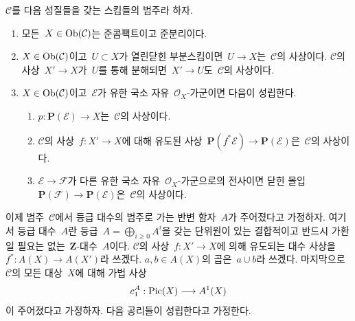 \medskip\noindent
$\mathcal{C}$를 다음 성질들을 갖는 스킴들의 범주라 하자.
\begin{enumerate}
\item 모든\  $X \in \mathop{\mathrm{Ob}}\nolimits(\mathcal{C})$는 준콤팩트이고 준분리이다.
\item $X \in \mathop{\mathrm{Ob}}\nolimits(\mathcal{C})$이고\  $U \subset X$가 열린닫힌
부분스킴이면\  $U \to X$는\  $\mathcal{C}$의 사상이다.
$\mathcal{C}$의 사상\  $X' \to X$가\  $U$를 통해 분해되면\ 
$X' \to U$도\  $\mathcal{C}$의 사상이다.
\item $X \in \mathop{\mathrm{Ob}}\nolimits(\mathcal{C})$이고\  $\mathcal{E}$가 유한 국소 자유\ 
$\mathcal{O}_X$-가군이면 다음이 성립한다.
\begin{enumerate}
\item $p : \mathbf{P}(\mathcal{E}) \to X$는\  $\mathcal{C}$의 사상이다.
\item $\mathcal{C}$의 사상\  $f : X' \to X$에 대해 유도된 사상\ 
$\mathbf{P}(f^*\mathcal{E}) \to \mathbf{P}(\mathcal{E})$은\ 
$\mathcal{C}$의 사상이다.
\item $\mathcal{E} \to \mathcal{F}$가 다른 유한 국소 자유\ 
$\mathcal{O}_X$-가군으로의 전사이면 닫힌 몰입\ 
$\mathbf{P}(\mathcal{F}) \to \mathbf{P}(\mathcal{E})$은\ 
$\mathcal{C}$의 사상이다.
\end{enumerate}
\end{enumerate}
이제 범주\  $\mathcal{C}$에서 등급 대수의 범주로 가는 반변 함자\ 
$A$가 주어졌다고 가정하자. 여기서 등급 대수\  $A$란 등급\ 
$A = \bigoplus_{i \geq 0} A^i$을 갖는 단위원이 있는 결합적이고
반드시 가환일 필요는 없는\  $\mathbf{Z}$-대수\  $A$이다.
$\mathcal{C}$의 사상\  $f : X' \to X$에 의해 유도되는 대수 사상을\ 
$f^* : A(X) \to A(X')$라 쓰겠다. $a, b \in A(X)$의 곱은\ 
$a \cup b$라 쓰겠다. 마지막으로\  $\mathcal{C}$의 모든 대상\  $X$에
대해 가법 사상
$$
c_1^A : \mathop{\mathrm{Pic}}\nolimits(X) \longrightarrow A^1(X)
$$
이 주어졌다고 가정하자. 다음 공리들이 성립한다고 가정한다.
